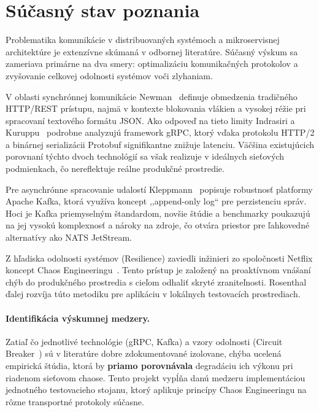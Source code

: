 \section{Súčasný stav poznania} \label{s: stav_poznania}

Problematika komunikácie v distribuovaných systémoch a mikroservisnej architektúre je extenzívne skúmaná v odbornej literatúre. Súčasný výskum sa zameriava primárne na dva smery: optimalizáciu komunikačných protokolov a zvyšovanie celkovej odolnosti systémov voči zlyhaniam.

V oblasti synchrónnej komunikácie Newman~\cite{Newman2021} definuje obmedzenia tradičného HTTP/REST prístupu, najmä v kontexte blokovania vlákien a vysokej réžie pri spracovaní textového formátu JSON. Ako odpoveď na tieto limity Indrasiri a Kuruppu~\cite{Indrasiri2020} podrobne analyzujú framework gRPC, ktorý vďaka protokolu HTTP/2 a binárnej serializácii Protobuf signifikantne znižuje latenciu. Väčšina existujúcich porovnaní týchto dvoch technológií sa však realizuje v ideálnych sieťových podmienkach, čo nereflektuje reálne produkčné prostredie.

Pre asynchrónne spracovanie udalostí Kleppmann~\cite{Kleppmann2017} popisuje robustnosť platformy Apache Kafka, ktorá využíva koncept ,,append-only log`` pre perzistenciu správ. Hoci je Kafka priemyselným štandardom, novšie štúdie a benchmarky poukazujú na jej vysokú komplexnosť a nároky na zdroje, čo otvára priestor pre ľahkovedné alternatívy ako NATS JetStream. 

Z hľadiska odolnosti systémov (Resilience) zaviedli inžinieri zo spoločnosti Netflix koncept Chaos Engineeringu~\cite{Basiri2016}. Tento prístup je založený na proaktívnom vnášaní chýb do produkčného prostredia s cieľom odhaliť skryté zraniteľnosti. Rosenthal~\cite{Rosenthal2020} ďalej rozvíja túto metodiku pre aplikáciu v lokálnych testovacích prostrediach. 

\paragraph{Identifikácia výskumnej medzery.} 
Zatiaľ čo jednotlivé technológie (gRPC, Kafka) a vzory odolnosti (Circuit Breaker~\cite{Montesi2016}) sú v literatúre dobre zdokumentované izolovane, chýba ucelená empirická štúdia, ktorá by \textbf{priamo porovnávala} degradáciu ich výkonu pri riadenom sieťovom chaose. Tento projekt vypĺňa danú medzeru implementáciou jednotného testovacieho stojanu, ktorý aplikuje princípy Chaos Engineeringu na rôzne transportné protokoly súčasne.